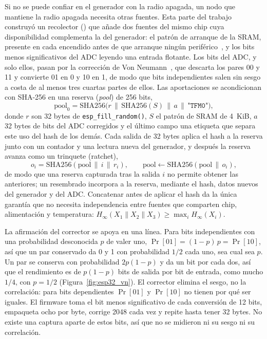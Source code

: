 Si no se puede confiar en el generador con la radio apagada, un nodo que
mantiene la radio apagada necesita otras fuentes. Esta parte del trabajo
construyó un recolector ()
que añade dos fuentes del mismo chip cuya disponibilidad complementa la
del generador: el patrón de arranque de la SRAM, presente en cada
encendido antes de que arranque ningún periférico~\cite{holcomb_2009_powerup},
y los bits menos significativos del ADC leyendo una entrada flotante.
Los bits del ADC, y solo ellos, pasan por la corrección de Von
Neumann~\cite{vonneumann_1951_various}, que descarta los pares 00 y 11 y
convierte 01 en 0 y 10 en 1, de modo que bits independientes salen sin
sesgo a costa de al menos tres cuartas partes de ellos. Las aportaciones
se acondicionan con SHA-256 en una reserva (\emph{pool}) de 256 bits,
\begin{equation}
\mathrm{pool}_0 = \mathrm{SHA256}\bigl(r \,\|\, \mathrm{SHA256}(S) \,\|\,
a \,\|\, \texttt{"TFM0"}\bigr),
\label{eq:esp32_pool}
\end{equation}
donde $r$ son 32 bytes de \texttt{esp\_fill\_random()}, $S$ el patrón de
SRAM de 4~KiB, $a$ 32 bytes de bits del ADC corregidos y el último campo
una etiqueta que separa este uso del hash de los demás. Cada salida de
32 bytes aplica el hash a la reserva junto con un contador y una lectura
nueva del generador, y después la reserva avanza como un trinquete
(ratchet),
\begin{equation}
o_i = \mathrm{SHA256}(\mathrm{pool} \,\|\, i \,\|\, r_i), \qquad
\mathrm{pool} \leftarrow \mathrm{SHA256}(\mathrm{pool} \,\|\, o_i),
\label{eq:esp32_ratchet}
\end{equation}
de modo que una reserva capturada tras la salida $i$ no permite obtener
las anteriores; un resembrado incorpora a la reserva, mediante el hash,
datos nuevos del generador y del ADC. Concatenar antes de aplicar el hash
da la única garantía que no necesita independencia entre fuentes que
comparten chip, alimentación y temperatura:
$H_\infty(X_1 \| X_2 \| X_3) \geq \max_i H_\infty(X_i)$.

La afirmación del corrector se apoya en una línea. Para bits
independientes con una probabilidad desconocida $p$ de valer uno,
$\Pr[01] = (1-p)\,p = \Pr[10]$, así que un par conservado da 0 y 1 con
probabilidad $1/2$ cada uno, sea cual sea $p$. Un par se conserva con
probabilidad $2p(1-p)$ y da un bit por cada dos, así que el rendimiento es
de $p(1-p)$ bits de salida por bit de entrada, como mucho $1/4$, con
$p = 1/2$ (Figura~\ref{fig:esp32_vn}). El corrector elimina el sesgo, no la
correlación: para bits dependientes $\Pr[01]$ y $\Pr[10]$ no tienen por
qué ser iguales. El firmware toma el bit menos significativo de cada
conversión de 12 bits, empaqueta ocho por byte, corrige 2048 cada vez y
repite hasta tener 32 bytes. No existe una captura aparte de estos bits,
así que no se midieron ni su sesgo ni su correlación.

